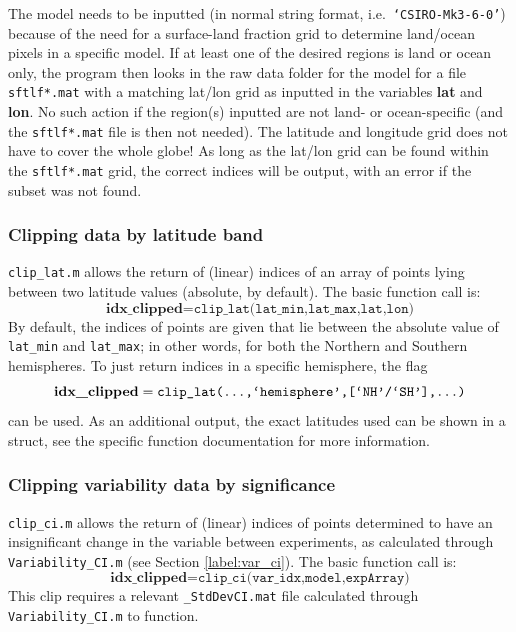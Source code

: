 \documentclass{article}
\begin{document}
The model needs to be inputted (in normal string format, i.e.\ \texttt{`CSIRO-Mk3-6-0'}) because of the need for a surface-land fraction grid to determine land/ocean pixels in a specific model. If at least one of the desired regions is land or ocean only, the program then looks in the raw data folder for the model for a file \texttt{sftlf*.mat} with a matching lat/lon grid as inputted in the variables \textbf{lat} and \textbf{lon}. No such action if the region(s) inputted are not land- or ocean-specific (and the \texttt{sftlf*.mat} file is then not needed). The latitude and longitude grid does not have to cover the whole globe! As long as the lat/lon grid can be found within the \texttt{sftlf*.mat} grid, the correct indices will be output, with an error if the subset was not found. 

\subsubsection{Clipping data by latitude band}
\texttt{clip\_lat.m} allows the return of (linear) indices of an array of points lying between two latitude values (absolute, by default). The basic function call is:
\begin{equation}
\textbf{idx\_clipped} = \texttt{clip\_lat(lat\_min,lat\_max,lat,lon)}
\end{equation}
By default, the indices of points are given that lie between the absolute value of \texttt{lat\_min} and \texttt{lat\_max}; in other words, for both the Northern and Southern hemispheres. To just return indices in a specific hemisphere, the flag 
\begin{equation}
\textbf{idx\_clipped} = \texttt{clip\_lat(\dots,`hemisphere',[`NH'/`SH'],\dots)}
\end{equation}
can be used. As an additional output, the exact latitudes used can be shown in a struct, see the specific function documentation for more information. 

\subsubsection{Clipping variability data by significance}
\texttt{clip\_ci.m} allows the return of (linear) indices of points determined to have an insignificant change in the variable between experiments, as calculated through \texttt{Variability\_CI.m} (see Section \ref{label:var_ci}). The basic function call is: 
\begin{equation}
\textbf{idx\_clipped} = \texttt{clip\_ci(var\_idx,model,expArray)}
\end{equation}
This clip requires a relevant \texttt{\_StdDevCI.mat} file calculated through \texttt{Variability\_CI.m} to function.  
\end{document}
